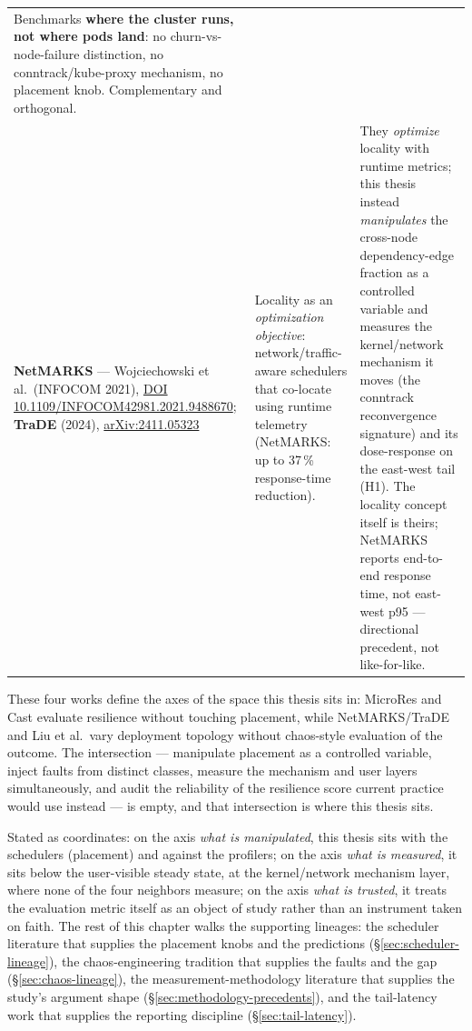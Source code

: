 \begin{center}
\begin{tabular}{p{}p{}p{}}
Benchmarks \textbf{where the cluster runs, not where pods land}: no churn-vs-node-failure distinction, no conntrack/kube-proxy mechanism, no placement knob. Complementary and orthogonal. \\
\addlinespace
\textbf{NetMARKS} --- Wojciechowski et al.\ (INFOCOM 2021), \href{https://ieeexplore.ieee.org/document/9488670/}{DOI 10.1109/INFOCOM42981.2021.9488670}; \textbf{TraDE} (2024), \href{https://arxiv.org/abs/2411.05323}{arXiv:2411.05323} &
Locality as an \emph{optimization objective}: network/traffic-aware schedulers that co-locate using runtime telemetry (NetMARKS: up to 37\,\% response-time reduction). &
They \emph{optimize} locality with runtime metrics; this thesis instead \emph{manipulates} the cross-node dependency-edge fraction as a controlled variable and measures the kernel/network mechanism it moves (the conntrack reconvergence signature) and its dose-response on the east-west tail (H1). The locality concept itself is theirs; NetMARKS reports end-to-end response time, not east-west p95 --- directional precedent, not like-for-like. \\
\bottomrule
\end{tabular}
\end{center}

These four works define the axes of the space this thesis sits in: MicroRes
and Cast evaluate resilience without touching placement, while NetMARKS/TraDE
and Liu et al.\ vary deployment topology without chaos-style evaluation of the
outcome. The intersection --- manipulate placement as a controlled variable,
inject faults from distinct classes, measure the mechanism and user layers
simultaneously, and audit the reliability of the resilience score current
practice would use instead --- is empty, and that intersection is where this
thesis sits.

Stated as coordinates: on the axis \emph{what is manipulated}, this thesis sits
with the schedulers (placement) and against the profilers; on the axis
\emph{what is measured}, it sits below the user-visible steady state, at the
kernel/network mechanism layer, where none of the four neighbors measure; on
the axis \emph{what is trusted}, it treats the evaluation metric itself as an
object of study rather than an instrument taken on faith. The rest of this
chapter walks the supporting lineages: the scheduler literature that supplies
the placement knobs and the predictions (\S\ref{sec:scheduler-lineage}), the
chaos-engineering tradition that supplies the faults and the gap
(\S\ref{sec:chaos-lineage}), the measurement-methodology literature that
supplies the study's argument shape (\S\ref{sec:methodology-precedents}), and
the tail-latency work that supplies the reporting discipline
(\S\ref{sec:tail-latency}).

